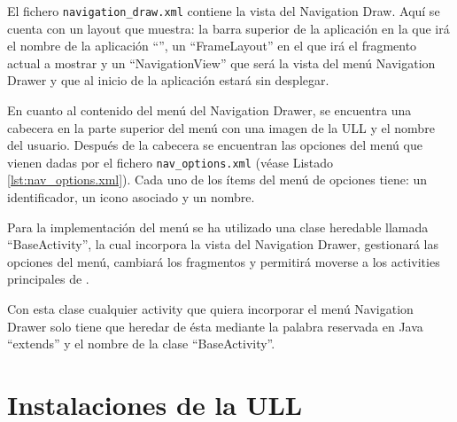El fichero \texttt{navigation\_draw.xml} contiene la vista del Navigation Draw. Aquí se cuenta con un layout que muestra: la barra superior de la aplicación en la que irá el nombre de la aplicación ``\ULLAR{}'', un ``FrameLayout'' en el que irá el fragmento actual a mostrar y un ``NavigationView'' que será la vista del menú Navigation Drawer y que al inicio de la aplicación estará sin desplegar.

En cuanto al contenido del menú del Navigation Drawer, se encuentra una cabecera en la parte superior del menú con una imagen de la ULL y el nombre del usuario. Después de la cabecera se encuentran las opciones del menú que vienen dadas por el fichero \texttt{nav\_options.xml} (véase Listado \ref{lst:nav_options.xml}). Cada uno de los ítems del menú de opciones tiene: un identificador, un icono asociado y un nombre.

\bigskip
\bigskip
\bigskip




% 
   
\bigskip



Para la implementación del menú se ha utilizado una clase heredable llamada ``BaseActivity'', la cual incorpora la vista del Navigation Drawer, gestionará las opciones del menú, cambiará los fragmentos y permitirá moverse a los activities principales de \ULLAR{}. 



Con esta clase cualquier activity que quiera incorporar el menú Navigation Drawer  solo tiene que heredar de ésta mediante la palabra reservada en Java ``extends'' y el nombre de la clase ``BaseActivity''.

        
\section{Instalaciones de la ULL}

